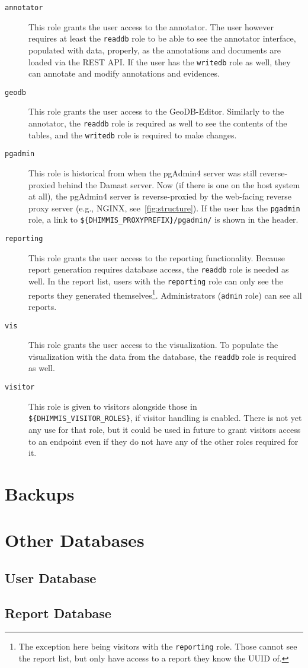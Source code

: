 \begin{description}
  \item[\texttt{annotator}]
    This role grants the user access to the annotator.
    The user however requires at least the \verb!readdb! role to be able to see the annotator interface, populated with data, properly, as the annotations and documents are loaded via the REST API.
    If the user has the \verb!writedb! role as well, they can annotate and modify annotations and evidences.
  \item[\texttt{geodb}]
    This role grants the user access to the GeoDB-Editor.
    Similarly to the annotator, the \verb!readdb! role is required as well to see the contents of the tables, and the \verb!writedb! role is required to make changes.
  \item[\texttt{pgadmin}]
    This role is historical from when the pgAdmin4 server was still reverse-proxied behind the Damast server.
    Now (if there is one on the host system at all), the pgAdmin4 server is reverse-proxied by the web-facing reverse proxy server (e.g., NGINX, see~\cref{fig:structure}).
    If the user has the \verb!pgadmin! role, a link to \verb!${DHIMMIS_PROXYPREFIX}/pgadmin/! is shown in the header.
  \item[\texttt{reporting}]
    This role grants the user access to the reporting functionality.
    Because report generation requires database access, the \verb!readdb! role is needed as well.
    In the report list, users with the \verb!reporting! role can only see the reports they generated themselves\footnote{%
      The exception here being visitors with the \texttt{reporting} role.
      Those cannot see the report list, but only have access to a report they know the UUID of.
    }.
    Administrators (\verb!admin! role) can see all reports.
  \item[\texttt{vis}]
    This role grants the user access to the visualization.
    To populate the visualization with the data from the database, the \verb!readdb! role is required as well.
  \item[\texttt{visitor}]
    This role is given to visitors alongside those in \verb!${DHIMMIS_VISITOR_ROLES}!, if visitor handling is enabled.
    There is not yet any use for that role, but it could be used in future to grant visitors access to an endpoint even if they do not have any of the other roles required for it.
\end{description}



\section{Backups}
\section{Other Databases}
\subsection{User Database}
\subsection{Report Database}
